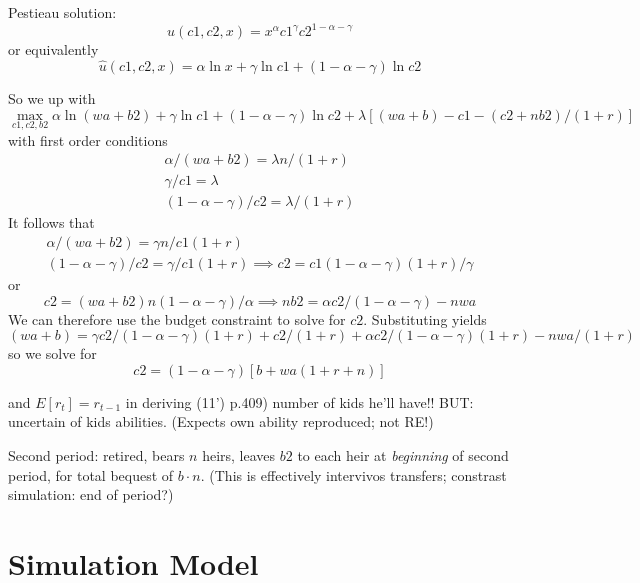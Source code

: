 \documentclass{article}
\begin{document}
Pestieau solution:
\begin{equation}
u(c1, c2, x) = x^{\alpha} c1^{\gamma} c2^{1-\alpha-\gamma}
\end{equation}
or equivalently
\begin{equation}
\hat{u}(c1, c2, x) = \alpha \ln x +\gamma \ln c1 + (1-\alpha-\gamma) \ln c2
\end{equation}


So we up with
\begin{equation}
\max_{c1, c2, b2}
\alpha \ln (wa+ b2) 
+ \gamma \ln c1
+ (1-\alpha-\gamma) \ln c2
+ \lambda[ (w a + b) - c1 - (c2 + n b2)/(1+r)]
\end{equation}
with first order conditions
\begin{gather}
\alpha/(wa+b2) = \lambda n/(1+r)
\\
\gamma/c1 = \lambda
\\
(1-\alpha-\gamma)/ c2 = \lambda / (1+r)
\end{gather}
It follows that
\begin{gather}
\alpha/(wa+b2) = \gamma n/ c1 (1+r)
\\
(1-\alpha-\gamma)/ c2 = \gamma / c1 (1+r)  \implies  c2 = c1 (1-\alpha-\gamma)(1+r)/\gamma 
\end{gather}
or
\begin{equation}
c2 = (wa+b2)n(1-\alpha-\gamma)/\alpha \implies n b2 = \alpha c2 /(1-\alpha-\gamma)  - nwa
\end{equation}
We can therefore use the budget constraint to solve for $c2$.
Substituting yields
\begin{equation}
(w a + b) = \gamma c2/(1-\alpha-\gamma)(1+r) + c2/(1+r) + \alpha c2/(1-\alpha-\gamma)(1+r) - nwa/(1+r) 
\end{equation}
so we solve for
\begin{equation}
c2 = (1-\alpha-\gamma)[b + wa(1+r+n)]
\end{equation}


and $E[r_t] = r_{t-1}$ in deriving (11')  p.409)  
number of kids he'll have!!
BUT: uncertain of kids abilities.  (Expects own ability reproduced; not RE!)

Second period:
retired,
bears $n$ heirs,
leaves $b2$ to each heir at \emph{beginning} of second period,
for total bequest of $b \cdot n$.
(This is effectively intervivos transfers;
constrast simulation: end of period?)


\section{Simulation Model}
\end{document}
